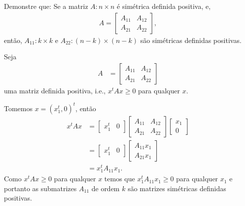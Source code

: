 \documentclass[a4paper,12pt, leqno, answers]{exam}
\begin{document}
\begin{questions}
    \question Demonstre que: Se a matriz $A : n \times n$ \'{e} sim\'{e}trica definida positiva, e,
    \begin{align*}
        A = \begin{bmatrix}
            A_{11} & A_{12} \\
            A_{21} & A_{22}
        \end{bmatrix},
    \end{align*}
    ent\~{a}o, $A_{11} : k \times k$ e $A_{22}: (n - k) \times (n - k)$ s\~{a}o sim\'{e}tricas definidas positivas.
    \begin{solution}
        Seja
        \begin{align*}
            A &= \begin{bmatrix}
                A_{11} & A_{12} \\
                A_{21} & A_{22}
            \end{bmatrix}
        \end{align*}
        uma matriz definida positiva, i.e., $x^t A x \geq 0$ para qualquer $x$.
        
        Tomemos $x = (x_1^t, 0)^t$, ent\~{a}o
        \begin{align*}
            x^t A x &= \begin{bmatrix}
                x_1^t & 0
            \end{bmatrix} \begin{bmatrix}
                A_{11} & A_{12} \\
                A_{21} & A_{22}
            \end{bmatrix} \begin{bmatrix}
                x_1 \\
                0
            \end{bmatrix} \\
            &= \begin{bmatrix}
                x_1^t & 0
            \end{bmatrix} \begin{bmatrix}
                A_{11} x_1 \\
                A_{21} x_1
            \end{bmatrix} \\
            &= x_1^t A_{11} x_1.
        \end{align*}
        Como $x^t A x \geq 0$ para qualquer $x$ temos que $x_1^t A_{11} x_1 \geq 0$ para qualquer $x_1$ e portanto as submatrizes $A_{11}$ de ordem $k$ s\~{a}o matrizes sim\'{e}tricas definidas positivas.


\end{solution}
\end{questions}
\end{document}
